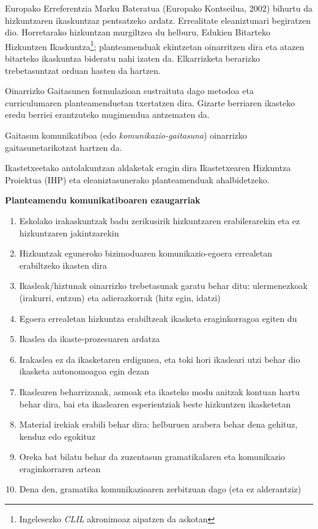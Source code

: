\documentclass[
]{book}
\providecommand{\tightlist}{%
  \setlength{\itemsep}{0pt}\setlength{\parskip}{0pt}}
\begin{document}
Europako Erreferentzia Marku Bateratua (Europako Kontseilua, 2002) bihurtu da hizkuntzaren ikaskuntzaz pentsatzeko ardatz. Errealitate eleaniztunari begiratzen dio. Horretarako hizkuntzan murgiltzea du helburu, Edukien Bitarteko Hizkuntzen Ikaskuntza\footnote{Ingelesezko \emph{CLIL} akronimoaz aipatzen da askotan}; planteamenduak ekintzetan oinarritzen dira eta atazen bitarteko ikaskuntza bideratu nahi izaten da. Elkarrizketa berarizko trebetasuntzat orduan hasten da hartzen.

Oinarrizko Gaitasunen formulazioan sustraituta dago metodoa eta curriculumaren planteamenduetan txertatzen dira. Gizarte berriaren ikasteko eredu berriei erantzuteko mugimendua antzematen da.

Gaitasun komunikatiboa (edo \emph{komunikazio-gaitasuna}) oinarrizko gaitasunetarikotzat hartzen da.

Ikastetxeetako antolakuntzan aldaketak eragin dira Ikastetxearen Hizkuntza Proiektua (IHP) eta eleaniztasunerako planteamenduak ahalbidetzeko.

\textbf{Planteamendu komunikatiboaren ezaugarriak}

\begin{enumerate}
\def\labelenumi{\arabic{enumi}.}
\tightlist
\item
  Eskolako irakaskuntzak badu zerikusirik hizkuntzaren erabilerarekin eta ez hizkuntzaren jakintzarekin
\item
  Hizkuntzak eguneroko bizimoduaren komunikazio-egoera errealetan erabiltzeko ikasten dira
\item
  Ikasleak/hiztunak oinarrizko trebetasunak garatu behar ditu: ulermenezkoak (irakurri, entzun) eta adierazkorrak (hitz egin, idatzi)
\item
  Egoera errealetan hizkuntza erabiltzeak ikasketa eraginkorragoa egiten du
\item
  Ikaslea da ikaste-prozesuaren ardatza
\item
  Irakaslea ez da ikasketaren erdigunea, eta toki hori ikasleari utzi behar dio ikasketa autonomoagoa egin dezan
\item
  Ikaslearen beharrizanak, asmoak eta ikasteko modu anitzak kontuan hartu behar dira, bai eta ikaslearen esperientziak beste hizkuntzen ikasketetan
\item
  Material irekiak erabili behar dira: helburuen arabera behar dena gehituz, kenduz edo egokituz
\item
  Oreka bat bilatu behar da zuzentasun gramatikalaren eta komunikazio eraginkorraren artean
\item
  Dena den, gramatika komunikazioaren zerbitzuan dago (eta ez alderantziz)
\end{enumerate}
\end{document}

